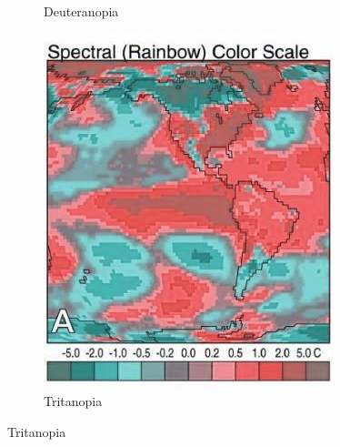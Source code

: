 \documentclass[11pt]{isuthesis}\usepackage[]{graphicx}\usepackage[]{color}
\begin{document}
\begin{figure}[!htbp]
\begin{minipage}[c]{.75\textwidth}
\begin{subfigure}[b]{.32\textwidth}
  \caption{Deuteranopia}
\end{subfigure}\hfil
\begin{subfigure}[b]{.32\textwidth}\centering
  \includegraphics[width=\textwidth]{RainbowScaleOrig-tritanopia}
  \caption{Tritanopia}
\end{subfigure}


\end{minipage}
\end{figure}
\end{document}
